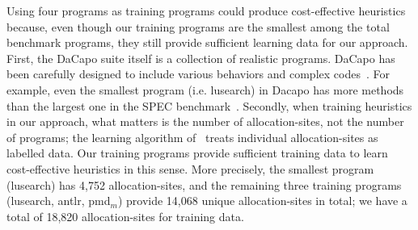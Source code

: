 %
%
%



Using four programs as training programs could produce cost-effective heuristics because, even though our training programs are the smallest among the total benchmark programs,
they still provide sufficient learning data for our approach.
First, the DaCapo suite itself is a collection of realistic programs.
DaCapo has been carefully designed to include various behaviors and complex codes~\cite{Blackburn2006}.
For example, even the smallest program (i.e. lusearch) in Dacapo has more methods than the largest one in the SPEC benchmark~\cite{specjvm98}.
Secondly, when training heuristics in our approach, what matters is the number of allocation-sites, not the number of programs;
the learning algorithm of \OurCtx~treats individual allocation-sites as labelled data.
Our training programs provide sufficient training data to learn cost-effective heuristics in this sense.
More precisely, the smallest program (lusearch) has 4,752 allocation-sites,
and the remaining three training programs (lusearch, antlr, pmd$_{m}$) provide 14,068 unique allocation-sites in total;
we have a total of 18,820 allocation-sites for training data.

